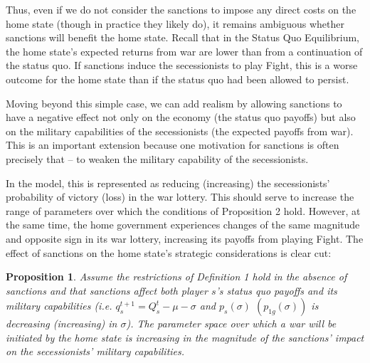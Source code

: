 \documentclass[11pt,letterpaper, notitlepage]{article}
\newtheorem{proposition}{Proposition}
\begin{document}
Thus, even if we do not consider the sanctions to impose any direct costs on the home state (though in practice they likely do), it remains ambiguous whether sanctions will benefit the home state. Recall that in the Status Quo Equilibrium, the home state's expected returns from war are lower than from a continuation of the status quo. If sanctions induce the secessionists to play Fight, this is a worse outcome for the home state than if the status quo had been allowed to persist.  


Moving beyond this simple case, we can add realism by allowing sanctions to have a negative effect not only on the economy (the status quo payoffs) but also on the military capabilities of the secessionists (the expected payoffs from war). This is an important extension because one motivation for sanctions is often precisely that -- to weaken the military capability of the secessionists. 

In the model, this is represented as reducing (increasing) the secessionists' probability of victory (loss) in the war lottery. This should serve to increase the range of parameters over which the conditions of Proposition 2 hold. However, at the same time, the home government experiences changes of the same magnitude and opposite sign in its war lottery, increasing its payoffs from playing Fight. The effect of sanctions on the home state's strategic considerations is clear cut:

\begin{proposition}
Assume the restrictions of \emph{Definition 1} hold in the absence of sanctions and that sanctions affect both player $s$'s status quo payoffs and its military capabilities (i.e. $q_s^{t+1} = Q_s^t - \mu -\sigma$ \emph{and} $p_s\left(\sigma\right)$ $\left(p_{1g}\left(\sigma\right)\right)$ is decreasing (increasing) in $\sigma$). The parameter space over which a war will be initiated by the home state is increasing in the magnitude of the sanctions' impact on the secessionists' military capabilities.
\end{proposition}
\end{document}
